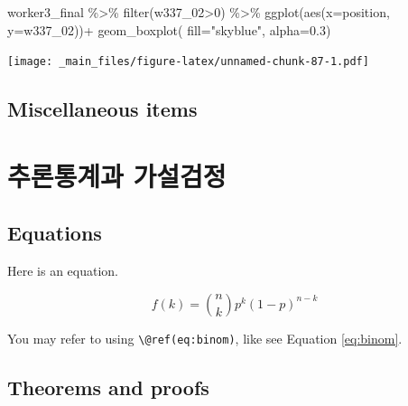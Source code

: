 \documentclass[
]{book}
\newenvironment{Shaded}{\begin{snugshade}}{\end{snugshade}}
\newcommand{\AttributeTok}[1]{\textcolor[rgb]{0.77,0.63,0.00}{#1}}
\newcommand{\DecValTok}[1]{\textcolor[rgb]{0.00,0.00,0.81}{#1}}
\newcommand{\FloatTok}[1]{\textcolor[rgb]{0.00,0.00,0.81}{#1}}
\newcommand{\FunctionTok}[1]{\textcolor[rgb]{0.00,0.00,0.00}{#1}}
\newcommand{\NormalTok}[1]{#1}
\newcommand{\SpecialCharTok}[1]{\textcolor[rgb]{0.00,0.00,0.00}{#1}}
\newcommand{\StringTok}[1]{\textcolor[rgb]{0.31,0.60,0.02}{#1}}
\theoremstyle{definition}
\theoremstyle{definition}
\theoremstyle{definition}
\theoremstyle{definition}
\theoremstyle{remark}
\begin{document}
\begin{Shaded}
\begin{Highlighting}[]
\NormalTok{worker3\_final }\SpecialCharTok{\%\textgreater{}\%} 
  \FunctionTok{filter}\NormalTok{(w337\_02}\SpecialCharTok{\textgreater{}}\DecValTok{0}\NormalTok{) }\SpecialCharTok{\%\textgreater{}\%}
  \FunctionTok{ggplot}\NormalTok{(}\FunctionTok{aes}\NormalTok{(}\AttributeTok{x=}\NormalTok{position, }\AttributeTok{y=}\NormalTok{w337\_02))}\SpecialCharTok{+}
  \FunctionTok{geom\_boxplot}\NormalTok{(}
    \AttributeTok{fill=}\StringTok{"skyblue"}\NormalTok{, }
    \AttributeTok{alpha=}\FloatTok{0.3}\NormalTok{)}
\end{Highlighting}
\end{Shaded}

\texttt{[image: \_main\_files/figure-latex/unnamed-chunk-87-1.pdf]}

\hypertarget{miscellaneous-items}{%
\section{Miscellaneous items}\label{miscellaneous-items}}

\hypertarget{probability}{%
\chapter{추론통계과 가설검정}\label{probability}}

\begin{quote}
\end{quote}

\hypertarget{equations}{%
\section{Equations}\label{equations}}

Here is an equation.

\begin{equation} 
  f\left(k\right) = \binom{n}{k} p^k\left(1-p\right)^{n-k}
  \label{eq:binom}
\end{equation}

You may refer to using \texttt{\textbackslash{}@ref(eq:binom)}, like see Equation \eqref{eq:binom}.

\hypertarget{theorems-and-proofs}{%
\section{Theorems and proofs}\label{theorems-and-proofs}}
\end{document}
